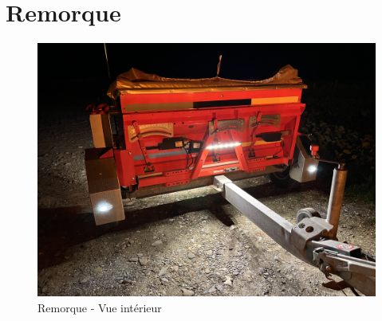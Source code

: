 \section{Remorque}
\begin{figure}[H]
    \centering
    \includegraphics[width=12cm]{assets/figures/remorque.jpeg}
    \caption{Remorque - Vue intérieur}
\end{figure}
